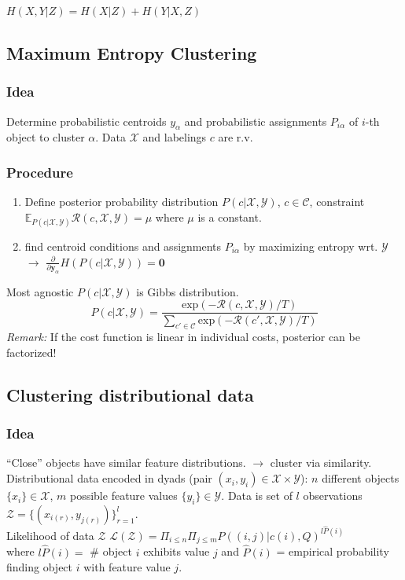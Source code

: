 \documentclass[9pt,parskip]{scrartcl}
\begin{document}
\begin{multicols*}{4}
$H(X,Y|Z) = H(X|Z) + H(Y|X,Z)$

\subsection*{Maximum Entropy Clustering}
\subsubsection*{Idea}
Determine probabilistic centroids $y_{\alpha}$ and probabilistic assignments $P_{i \alpha}$ of $i$-th object to cluster $\alpha$. Data $\mathcal{X}$ and labelings $c$ are r.v.

\subsubsection*{Procedure}
\begin{enumerate}
	\item Define posterior probability distribution $P(c|\mathcal{X},\mathcal{Y})$, $c \in \mathcal{C}$, constraint $\mathbb{E}_{P(c|\mathcal{X},\mathcal{Y})} \mathcal{R}(c,\mathcal{X},\mathcal{Y}) = \mu$ where $\mu$ is a constant.
	\item find centroid conditions and assignments $P_{i \alpha}$ by maximizing entropy wrt. $\mathcal{Y}$ $\to$ $\frac{\partial }{\partial \mathbf{y}_{\alpha}} H(P(c|\mathcal{X},\mathcal{Y})) = \mathbf{0}$
\end{enumerate}
Most agnostic $P(c|\mathcal{X},\mathcal{Y})$ is Gibbs distribution.  \\

\[P(c|\mathcal{X},\mathcal{Y})=\frac{\text{exp}(-\mathcal{R}(c,\mathcal{X},\mathcal{Y})/T)}{\sum_{c' \in \mathcal{C}} \text{exp}(-\mathcal{R}(c',\mathcal{X},\mathcal{Y})/T)}\]
\textit{Remark:} If the cost function is linear in individual costs, posterior can be factorized!

\subsection*{Clustering distributional data}
\subsubsection*{Idea}
"`Close"' objects have similar feature distributions. $\to$ cluster via similarity. \\
Distributional data encoded in dyads (pair $(x_i, y_i) \in \mathcal{X} \times \mathcal{Y} $): $n$ different objects $\{x_i\} \in \mathcal{X}$, $m$ possible feature values $\{y_i\} \in \mathcal{Y}$. Data is set of $l$ observations $\mathcal{Z} = \{ (x_{i(r)}, y_{j(r)})\}_{r=1}^{l}$. \\
Likelihood of data $\mathcal{Z}$ $\mathcal{L}(\mathcal{Z}) = \Pi_{i \leq n} \Pi_{j \leq m} P((i,j)|c(i),Q)^{l\hat{P}(i)}$ \\
where $l\hat{P}(i) =$ \# object $i$ exhibits value $j$ and $\hat{P}(i) $ = empirical probability finding object $i$ with feature value $j$.


\end{multicols*}
\end{document}
